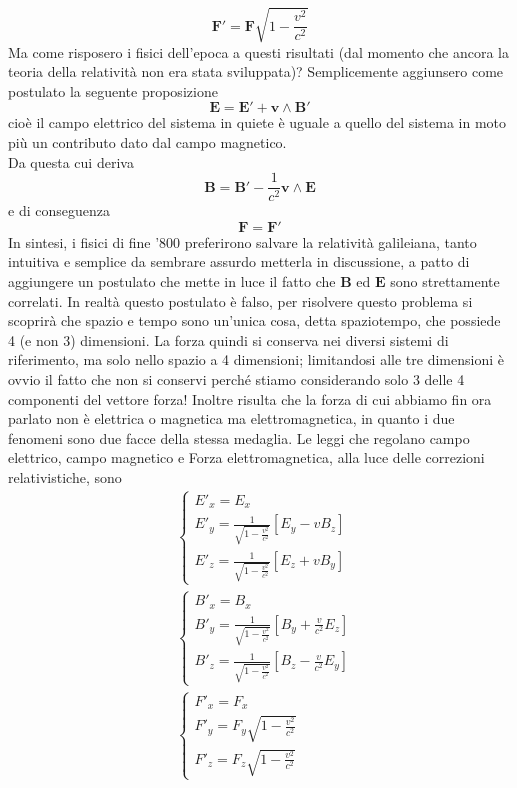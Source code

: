 \documentclass[10pt,a4paper]{article}
\begin{document}
\[\mathbf{F'}=\mathbf{F}\sqrt{1-\frac{v^2}{c^2}}\]
Ma come risposero i fisici dell'epoca a questi risultati (dal momento che ancora la teoria della relatività non era stata sviluppata)? Semplicemente aggiunsero come postulato la seguente proposizione
\[\mathbf{E}=\mathbf{E}'+\mathbf{v}\wedge\mathbf{B}'\]
cioè il campo elettrico del sistema in quiete è uguale a quello del sistema in moto più un contributo dato dal campo magnetico.\\
Da questa cui deriva
\[\mathbf{B}=\mathbf{B}'-\frac{1}{c^2}\mathbf{v}\wedge\mathbf{E}\]
e di conseguenza
\[\mathbf{F}=\mathbf{F}'\]
In sintesi, i fisici di fine '800 preferirono salvare la relatività galileiana, tanto intuitiva e semplice da sembrare assurdo metterla in discussione, a patto di aggiungere un postulato che mette in luce il fatto che \(\mathbf{B}\) ed \(\mathbf{E}\) sono strettamente correlati. In realtà questo postulato è falso, per risolvere questo problema si scoprirà che spazio e tempo sono un'unica cosa, detta spaziotempo, che possiede 4 (e non 3) dimensioni. La forza quindi si conserva nei diversi sistemi di riferimento, ma solo nello spazio a 4 dimensioni; limitandosi alle tre dimensioni è ovvio il fatto che non si conservi perché stiamo considerando solo 3 delle 4 componenti del vettore forza! Inoltre risulta che la forza di cui abbiamo fin ora parlato non è elettrica o magnetica ma elettromagnetica, in quanto i due fenomeni sono due facce della stessa medaglia. Le leggi che regolano campo elettrico, campo magnetico e Forza elettromagnetica, alla luce delle correzioni relativistiche, sono
\begin{align*}
	&\begin{cases}
		E'_x=E_x \\
		E'_y=\frac{1}{\sqrt{1-\frac{v^2}{c^2}}}[E_y-vB_z]\\
		E'_z=\frac{1}{\sqrt{1-\frac{v^2}{c^2}}}[E_z+vB_y]
	\end{cases}\\
	&\begin{cases}
		B'_x=B_x \\
		B'_y=\frac{1}{\sqrt{1-\frac{v^2}{c^2}}}[B_y+\frac{v}{c^2}E_z] \\
		B'_z=\frac{1}{\sqrt{1-\frac{v^2}{c^2}}}[B_z-\frac{v}{c^2}E_y]
	\end{cases}\\
	&\begin{cases}
		F'_x=F_x \\
		F'_y=F_y\sqrt{1-\frac{v^2}{c^2}} \\
		F'_z=F_z\sqrt{1-\frac{v^2}{c^2}}
	\end{cases}	
\end{align*}
\appendix
\end{document}
